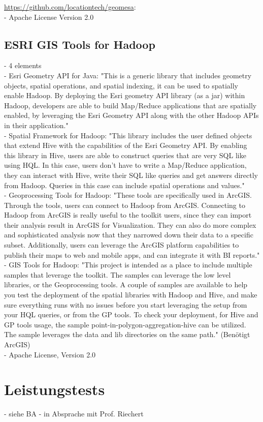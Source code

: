 \url{https://github.com/locationtech/geomesa}:\\
- Apache License Version 2.0


\subsection{ESRI GIS Tools for Hadoop}
- 4 elements\\
- Esri Geometry API for Java: "This is a generic library that includes geometry objects, spatial operations, and spatial indexing, it can be used to spatially enable Hadoop. By deploying the Esri geometry API library (as a jar) within Hadoop, developers are able to build Map/Reduce applications that are spatially enabled, by leveraging the Esri Geometry API along with the other Hadoop APIs in their application."\cite{website:esri-hadoop2}\\
- Spatial Framework for Hadoop: "This library includes the user defined objects that extend Hive with the capabilities of the Esri Geometry API. By enabling this library in Hive, users are able to construct queries that are very SQL like using HQL. In this case, users don’t have to write a Map/Reduce application, they can interact with Hive, write their SQL like queries and get answers directly from Hadoop. Queries in this case can include spatial operations and values."\cite{website:esri-hadoop2}\\
- Geoprocessing Tools for Hadoop: "These tools are specifically used in ArcGIS. Through the tools, users can connect to Hadoop from ArcGIS. Connecting to Hadoop from ArcGIS is really useful to the toolkit users, since they can import their analysis result in ArcGIS for Visualization. They can also do more complex and sophisticated analysis now that they narrowed down their data to a specific subset. Additionally, users can leverage the ArcGIS platform capabilities to publish their maps to web and mobile apps, and can integrate it with BI reports."\cite{website:esri-hadoop2}\\
- GIS Tools for Hadoop: "This project is intended as a place to include multiple samples that leverage the toolkit. The samples can leverage the low level libraries, or the Geoprocessing tools. A couple of samples are available to help you test the deployment of the spatial libraries with Hadoop and Hive, and make sure everything runs with no issues before you start leveraging the setup from your HQL queries, or from the GP tools. To check your deployment, for Hive and GP tools usage, the sample point-in-polygon-aggregation-hive can be utilized. The sample leverages the data and lib directories on the same path."\cite{website:esri-hadoop2} (Benötigt ArcGIS)\\
- Apache License, Version 2.0

\section{Leistungstests}

- siehe BA
- in Absprache mit Prof. Riechert